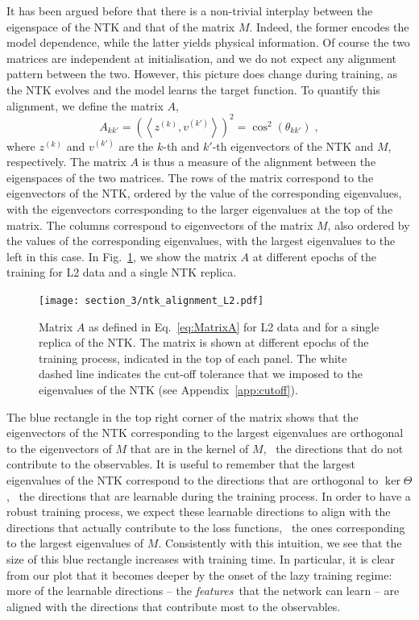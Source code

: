 It has been argued before that there is a non-trivial interplay between the
eigenspace of the NTK and that of the matrix $M$. Indeed, the former encodes the
model dependence, while the latter yields physical information. Of course the
two matrices are independent at initialisation, and we do not expect any
alignment pattern between the two. However, this picture does change during
training, as the NTK evolves and the model learns the target function. To
quantify this alignment, we define the matrix $A$, 
\begin{equation}
  \label{eq:MatrixA}
  A_{kk'} = \left( \left< z^{(k)}, v^{(k')}\right> \right)^2 = \cos^2(\theta_{kk'}) \;,
\end{equation}
where $z^{(k)}$ and $v^{(k')}$ are the $k$-th and $k'$-th eigenvectors of the
NTK and $M$, respectively. The matrix $A$ is thus a measure of the alignment
between the eigenspaces of the two matrices. The rows of the matrix correspond
to the eigenvectors of the NTK, ordered by the value of the corresponding
eigenvalues, with the eigenvectors corresponding to the larger eigenvalues at
the top of the matrix. The columns correspond to eigenvectors of the matrix $M$,
also ordered by the values of the corresponding eigenvalues, with the largest
eigenvalues to the left in this case. In Fig.~\ref{fig:NtkMAlign}, we show the
matrix $A$ at different epochs of the training for L2 data and a single NTK
replica. 
\begin{figure}[ht!]
  \centering
  \texttt{[image: section\_3/ntk\_alignment\_L2.pdf]}
  \caption{Matrix $A$ as defined in Eq.~\eqref{eq:MatrixA} for L2 data and for a
  single replica of the NTK. The matrix is shown at different epochs of the
  training process, indicated in the top of each panel. The white dashed line
  indicates the cut-off tolerance that we imposed to the eigenvalues of the NTK
  (see Appendix~\ref{app:cutoff}).}
  \label{fig:NtkMAlign}
\end{figure}

The blue rectangle in the top right corner of the matrix shows that the
eigenvectors of the NTK corresponding to the largest eigenvalues are orthogonal
to the eigenvectors of $M$ that are in the kernel of $M$, \ie\ the directions
that do not contribute to the observables. It is useful to remember that the
largest eigenvalues of the NTK correspond to the directions that are orthogonal
to $\ker\Theta$, \ie\ the directions that are learnable during the training
process. In order to have a robust training process, we expect these learnable
directions to align with the directions that actually contribute to the loss
functions, \ie\ the ones corresponding to the largest eigenvalues of $M$.
Consistently with this intuition, we see that the size of this blue rectangle
increases with training time. In particular, it is clear from our plot that it
becomes deeper by the onset of the lazy training regime: more of the learnable
directions -- the {\it features}\ that the network can learn -- are aligned with
the directions that contribute most to the observables.

